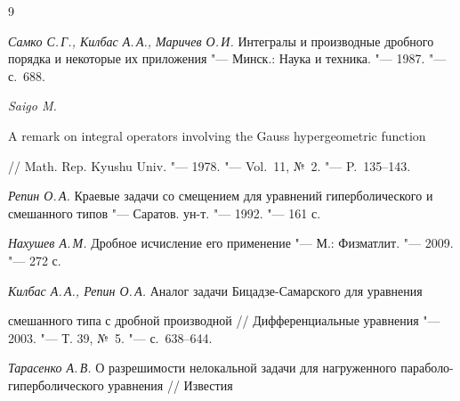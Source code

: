 




\newpage



\makeengtitlem







\begin{thebibliography}{9}



\emph{Самко С.\,Г., Килбас А.\,А., Маричев О.\,И.} Интегралы и производные дробного порядка и некоторые их приложения "---  Минск.: Наука и техника. "--- 1987. "--- с.~688.





\emph{Saigo M.}

A remark on integral operators involving the Gauss hypergeometric function

/\!/ Math. Rep. Kyushu Univ. "--- 1978. "--- Vol.~11, №~2. "--- P.~135--143.





\emph{Репин О.\,А.} Краевые задачи со смещением для уравнений гиперболического и смешанного типов "--- Саратов. ун-т. "--- 1992. "--- 161 с.





\emph{Нахушев А.\,М.} Дробное исчисление его применение "--- М.: Физматлит. "--- 2009. "--- 272 с.





\emph{Килбас А.\,А., Репин О.\,А.} Аналог задачи Бицадзе-Самарского для уравнения

смешанного типа с дробной производной /\!/ Дифференциальные уравнения "--- 2003. "--- Т. 39, №~5. "--- с.~638--644.





\emph{Тарасенко А.\,В.} О разрешимости нелокальной задачи для нагруженного параболо-гиперболического уравнения /\!/ Известия


\end{thebibliography}

